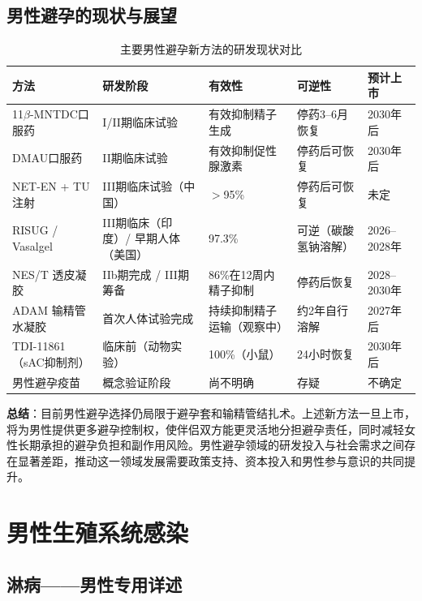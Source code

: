 \subsection{男性避孕的现状与展望}

\begin{table}[htbp]
\centering
\caption{主要男性避孕新方法的研发现状对比}
\label{tab:male_contraception_new}
\begin{tabularx}{\textwidth}{@{}lXXXX@{}}
    \toprule
    \textbf{方法} & \textbf{研发阶段} & \textbf{有效性} & \textbf{可逆性} & \textbf{预计上市} \\
    \midrule
    11$\beta$-MNTDC口服药 & I/II期临床试验 & 有效抑制精子生成 & 停药3--6月恢复 & 2030年后 \\
    DMAU口服药 & II期临床试验 & 有效抑制促性腺激素 & 停药后可恢复 & 2030年后 \\
    NET-EN + TU注射 & III期临床试验（中国） & $>$95\% & 停药后可恢复 & 未定 \\
    RISUG / Vasalgel & III期临床（印度）/ 早期人体（美国） & 97.3\% & 可逆（碳酸氢钠溶解） & 2026--2028年 \\
    NES/T 透皮凝胶 & IIb期完成 / III期筹备 & 86\%在12周内精子抑制 & 停药后恢复 & 2028--2030年 \\
    ADAM 输精管水凝胶 & 首次人体试验完成 & 持续抑制精子运输（观察中） & 约2年自行溶解 & 2027年后 \\
    TDI-11861（sAC抑制剂） & 临床前（动物实验） & 100\%（小鼠） & 24小时恢复 & 2030年后 \\
    男性避孕疫苗 & 概念验证阶段 & 尚不明确 & 存疑 & 不确定 \\
    \bottomrule
\end{tabularx}
\end{table}

\noindent\textbf{总结}：目前男性避孕选择仍局限于避孕套和输精管结扎术。上述新方法一旦上市，将为男性提供更多避孕控制权，使伴侣双方能更灵活地分担避孕责任，同时减轻女性长期承担的避孕负担和副作用风险。男性避孕领域的研发投入与社会需求之间存在显著差距，推动这一领域发展需要政策支持、资本投入和男性参与意识的共同提升。

\section{男性生殖系统感染}
\subsection{淋病——男性专用详述}
